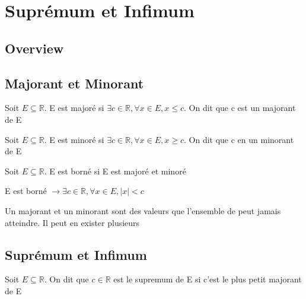 \documentclass{article}
\begin{document}
\pagebreak

\section{Suprémum et Infimum}

\subsection{Overview}

\subsection{Majorant et Minorant}

\begin{definition}[Majorant]
    Soit $E \subseteq \mathbb{R}$. E est majoré si $\exists c \in \mathbb{R}, \forall
    x \in E, x \leq c$. On dit que c est un majorant de E
\end{definition}

\begin{definition}[Minorant]
    Soit $E \subseteq \mathbb{R}$. E est minoré si $\exists c \in \mathbb{R}, \forall
    x \in E, x \geq c$. On dit que c en un minorant de E
\end{definition}

\begin{definition}
    Soit $E \subseteq \mathbb{R}$. E est borné si E est majoré et minoré
\end{definition}

\begin{proposition}
    E est borné $ \to \exists c \in \mathbb{R}, \forall x \in E, |x|<c $
\end{proposition}

\begin{remark}
    Un majorant et un minorant sont des valeurs que l'ensemble de peut jamais
    atteindre. Il peut en exister plusieurs
\end{remark}

\subsection{Suprémum et Infimum}

\begin{definition}[Supremum]
    Soit $E \subseteq \mathbb{R}$. On dit que $c \in \mathbb{R}$ est le supremum
    de E si c'est le plus petit majorant de E
\end{definition}
\end{document}
